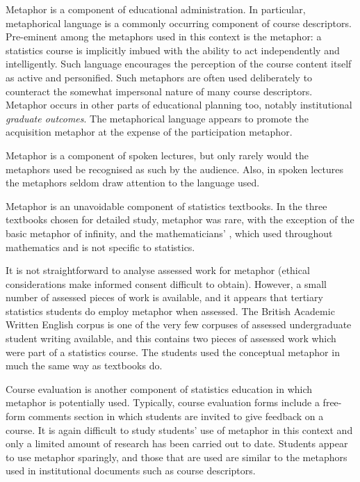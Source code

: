 Metaphor is a component of educational administration.  In particular,
metaphorical language is a commonly occurring component of course
descriptors.  Pre-eminent among the metaphors used in this context is
the  metaphor: a statistics course is implicitly
imbued with the ability to act independently and intelligently.  Such
language encourages the perception of the course content itself as
active and personified.  Such metaphors are often used deliberately to
counteract the somewhat impersonal nature of many course descriptors.
Metaphor occurs in other parts of educational planning too, notably
institutional \emph{graduate outcomes}.  The metaphorical language
appears to promote the acquisition metaphor at the expense of the
participation metaphor.

Metaphor is a component of spoken lectures, but only rarely would the
metaphors used be recognised as such by the audience.  Also, in spoken
lectures the metaphors seldom draw attention to the language used.

Metaphor is an unavoidable component of statistics textbooks.  In the
three textbooks chosen for detailed study, metaphor was rare, with the
exception of the basic metaphor of infinity, and the mathematicians'
, which used throughout mathematics and is not specific to
statistics.

It is not straightforward to analyse assessed work for metaphor
(ethical considerations make informed consent difficult to obtain).
However, a small number of assessed pieces of work is available, and
it appears that tertiary statistics students do employ metaphor when
assessed.  The British Academic Written English corpus is one of the
very few corpuses of assessed undergraduate student writing available,
and this contains two pieces of assessed work which were part of a
statistics course.  The students used the conceptual metaphor
 in much the same way as textbooks do.

Course evaluation is another component of statistics education in
which metaphor is potentially used.  Typically, course evaluation
forms include a free-form comments section in which students are
invited to give feedback on a course.  It is again difficult to study
students' use of metaphor in this context and only a limited amount of
research has been carried out to date.  Students appear to use
metaphor sparingly, and those that are used are similar to the
metaphors used in institutional documents such as course descriptors.


